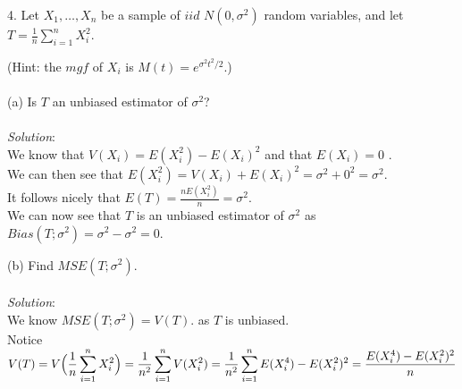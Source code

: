 \documentclass[12pt]{article}
\newcommand{\XB}{\color{black}}
\newcommand{\XBB}{\color{blue}}
\begin{document}
4. Let $ X_{1}, \dots, X_{n} $ be a sample of $ iid $ $ N(0, \sigma^{2}) $ random variables, and let $ \displaystyle T = \frac{1}{n} \sum_{i=1}^{n} X_{i}^{2} $. 

(Hint: the $ mgf $ of $ X_{i} $ is $ \displaystyle M(t) = e^{\sigma^{2}t^{2}/2} $.) \\

\XBB\hrulefill\XB 
\vspace{5mm} \\


(a) Is $ T $ an unbiased estimator of $ \sigma^{2} $? \\
\vspace{2.5mm} \\
\textit{Solution}:
\vspace{2.5mm} \\

\noindent 
We know that $ V(X_{i}) = E(X_{i}^{2}) - E(X_{i})^{2} $ and that $ E(X_{i}) = 0 $ . \\

\noindent
We can then see that $ E(X_{i}^{2}) = V(X_{i}) + E(X_{i})^{2} = \sigma^{2} + 0^{2} = \sigma^{2} $. \\

\noindent
It follows nicely that $ \displaystyle E(T) = \frac{nE(X_{i}^{2})}{n} = \sigma^{2} $. \\

\noindent
We can now see that $ T $ is an unbiased estimator of $ \sigma^{2} $ as $ Bias(T; \sigma^{2}) = \sigma^{2} - \sigma^{2} = 0 $. \\
\newpage


(b) Find $ MSE(T; \sigma^{2}) $. \\
\vspace{2.5mm} \\
\textit{Solution}:
\vspace{2.5mm} \\

\noindent 
We know $ MSE(T; \sigma^{2}) = V(T) $. as $ T $ is unbiased. \\

\noindent
Notice $ \displaystyle V(T) = V\Bigl( \frac{1}{n} \sum_{i=1}^{n} X_{i}^{2} \Bigr) = \frac{1}{n^{2}} \sum_{i=1}^{n} V(X_{i}^{2}) = \frac{1}{n^{2}} \sum_{i=1}^{n} E(X_{i}^{4}) - E(X_{i}^{2})^{2} = \frac{E(X_{i}^{4}) - E(X_{i}^{2})^{2}}{n} $ \\
\end{document}
